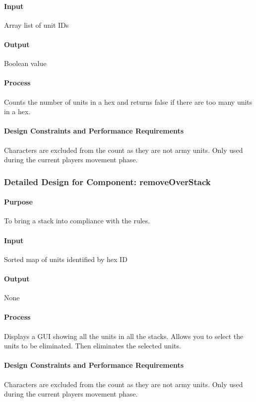 \documentclass[12pt,a4paper,titlepage]{article}
\begin{document}
\paragraph{Input} Array list of unit IDs
\paragraph{Output} Boolean value
\paragraph{Process} Counts the number of units in a hex and returns false if there are too many units in a hex.
\paragraph{Design Constraints and Performance Requirements} Characters are excluded from the count as they are not army units.  Only used during the current players movement phase.

\subsubsection{Detailed Design for Component: removeOverStack}
\paragraph{Purpose} To bring a stack into compliance with the rules.
\paragraph{Input} Sorted map of units identified by hex ID
\paragraph{Output} None
\paragraph{Process} Displays a GUI showing all the units in all the stacks. Allows you to select the units to be eliminated. Then eliminates the selected units.
\paragraph{Design Constraints and Performance Requirements} Characters are excluded from the count as they are not army units.  Only used during the current players movement phase.  
\end{document}
